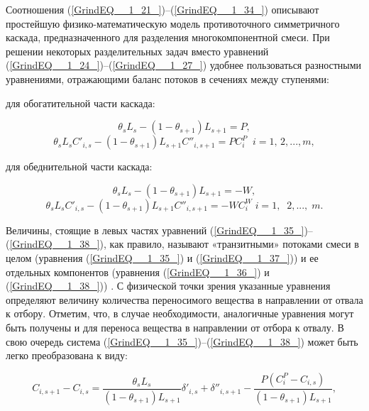Соотношения (\ref{GrindEQ__1_21_})--(\ref{GrindEQ__1_34_}) описывают простейшую физико-математическую модель противоточного симметричного каскада, предназначенного для разделения многокомпонентной смеси. При решении некоторых разделительных задач вместо уравнений (\ref{GrindEQ__1_24_})--(\ref{GrindEQ__1_27_}) удобнее пользоваться разностными уравнениями, отражающими баланс потоков в сечениях между ступенями:

для обогатительной части каскада:

\begin{equation} \label{GrindEQ__1_35_} 
  \theta _{s} L_{s} -(1-\theta _{s+1} )L_{s+1} =P, 
  \end{equation} 
  \begin{equation} \label{GrindEQ__1_36_} 
  \theta _{s} L_{s} C'_{i,s} -(1-\theta _{s+1} )L_{s+1} C''_{i,s+1} =PC_{i}^{P} \; \; i=1,\, 2,...,m,        
  \end{equation} 

для обеднительной части каскада:

\begin{equation} \label{GrindEQ__1_37_} 
  \theta _{s} L_{s} -(1-\theta _{s+1} )L_{s+1} =-W, 
  \end{equation} 
  \begin{equation} \label{GrindEQ__1_38_} 
  \theta _{s} L_{s} C'_{i,s} -(1-\theta _{s+1} )L_{s+1} C''_{i,s+1} =-WC_{i}^{W} \; i=1,\; \; 2,...,\; m.        
  \end{equation} 

Величины, стоящие в левых частях уравнений (\ref{GrindEQ__1_35_})--(\ref{GrindEQ__1_38_}), как правило, называют «транзитными» потоками смеси в целом (уравнения (\ref{GrindEQ__1_35_}) и (\ref{GrindEQ__1_37_})) и ее отдельных компонентов (уравнения (\ref{GrindEQ__1_36_}) и (\ref{GrindEQ__1_38_})) \cite{sulaberidzeTeoriyaKaskadovDlya2011}. С физической точки зрения указанные уравнения определяют величину количества переносимого вещества в направлении от отвала к отбору. Отметим, что, в случае необходимости, аналогичные уравнения могут быть получены и для переноса вещества в направлении от отбора к отвалу. 
В свою очередь система (\ref{GrindEQ__1_35_})--(\ref{GrindEQ__1_38_}) может быть легко преобразована к виду:

\begin{equation} \label{GrindEQ__1_39_} 
  C_{i,s+1} -C_{i,s} =\frac{\theta _{s} L_{s} }{(1-\theta _{s+1} )L_{s+1} } \delta '_{i,s} +\delta ''_{i,s+1} -\frac{P\left(C_{i}^{P} -C_{i,s} \right)}{(1-\theta _{s+1} )L_{s+1} } ,        
  \end{equation} 

